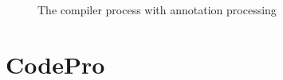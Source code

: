 	
	
		
	
\begin{figure}
\centering
{}
\caption{The compiler process with annotation processing\label{fig:annProc}}
\end{figure}
		

\section{CodePro}



